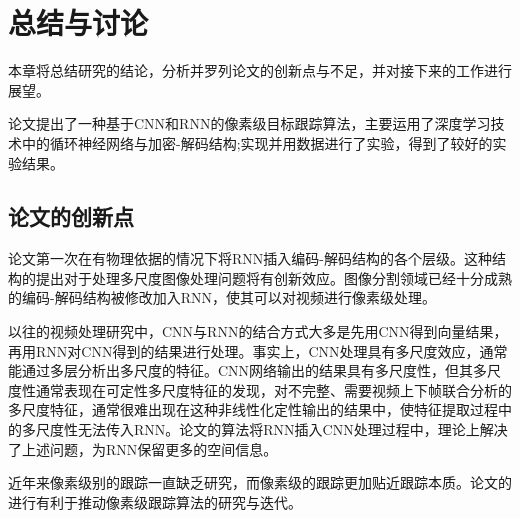
\chapter{总结与讨论}
本章将总结研究的结论，分析并罗列论文的创新点与不足，并对接下来的工作进行展望。
\par
论文提出了一种基于CNN和RNN的像素级目标跟踪算法，主要运用了深度学习技术中的循环神经网络与加密-解码结构;实现并用数据进行了实验，得到了较好的实验结果。
\section{论文的创新点}
论文第一次在有物理依据的情况下将RNN插入编码-解码结构的各个层级。这种结构的提出对于处理多尺度图像处理问题将有创新效应。图像分割领域已经十分成熟的编码-解码结构被修改加入RNN，使其可以对视频进行像素级处理。
\par
以往的视频处理研究中，CNN与RNN的结合方式大多是先用CNN得到向量结果，再用RNN对CNN得到的结果进行处理。事实上，CNN处理具有多尺度效应，通常能通过多层分析出多尺度的特征。CNN网络输出的结果具有多尺度性，但其多尺度性通常表现在可定性多尺度特征的发现，对不完整、需要视频上下帧联合分析的多尺度特征，通常很难出现在这种非线性化定性输出的结果中，使特征提取过程中的多尺度性无法传入RNN。论文的算法将RNN插入CNN处理过程中，理论上解决了上述问题，为RNN保留更多的空间信息。
\par
近年来像素级别的跟踪一直缺乏研究，而像素级的跟踪更加贴近跟踪本质。论文的进行有利于推动像素级跟踪算法的研究与迭代。
